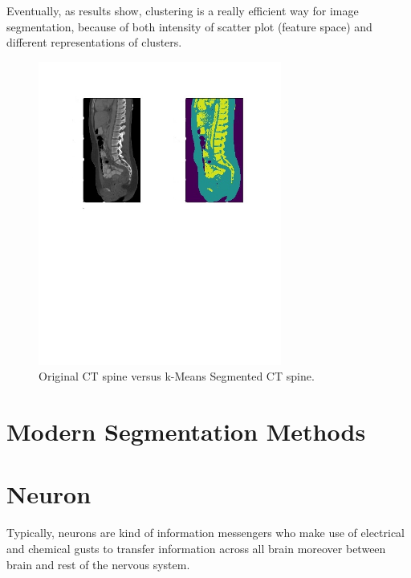 Eventually, as results show, clustering is a really efficient way for image segmentation, because of both intensity of scatter plot (feature space) and different representations of clusters.

\begin{figure}[h]
    \centering \includegraphics[width=8cm]{images/ct-spine-k-means-segmented.jpg}
    \vspace*{-50mm} \caption {Original CT spine versus k-Means Segmented CT spine.}
\end{figure}


\section{Modern Segmentation Methods}
\section{Neuron}
Typically, neurons are kind of information messengers who make use of electrical and chemical gusts to transfer information across all brain moreover between brain and rest of the nervous system.

